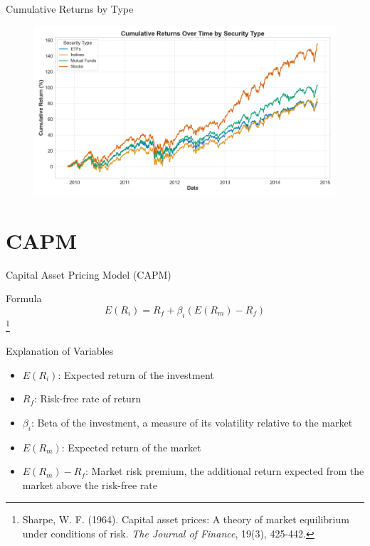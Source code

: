 \documentclass{beamer}
\begin{document}
\begin{frame}{Cumulative Returns by Type}
    \begin{figure}
        \centering
        \includegraphics[width=\linewidth]{../Figures/cumulative_returns_by_type.png}
    \end{figure}
\end{frame}







\section{CAPM}
\begin{frame}{Capital Asset Pricing Model (CAPM)}
    \begin{block}{Formula} 
        \begin{equation*}
            E(R_i) = R_f + \beta_i (E(R_m) - R_f)
        \end{equation*}
        \footnote{Sharpe, W. F. (1964). Capital asset prices: A theory of market equilibrium under conditions of risk. \textit{The Journal of Finance}, 19(3), 425-442.}
    \end{block}
    \begin{block}{Explanation of Variables}
        \begin{itemize}
            \item \( E(R_i) \): Expected return of the investment
            \item \( R_f \): Risk-free rate of return
            \item \( \beta_i \): Beta of the investment, a measure of its volatility relative to the market
            \item \( E(R_m) \): Expected return of the market
            \item \( E(R_m) - R_f \): Market risk premium, the additional return expected from the market above the risk-free rate
        \end{itemize}
    \end{block}
\end{frame}
\end{document}
